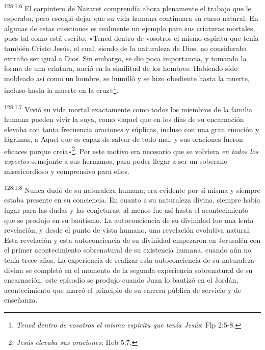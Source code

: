\par 
\textsuperscript{128:1.6} El carpintero de Nazaret comprendía ahora plenamente el trabajo que le esperaba, pero escogió dejar que su vida humana continuara su curso natural. En algunas de estas cuestiones es realmente un ejemplo para sus criaturas mortales, pues tal como está escrito: «Tened dentro de vosotros el mismo espíritu que tenía también Cristo Jesús, el cual, siendo de la naturaleza de Dios, no consideraba extraño ser igual a Dios. Sin embargo, se dio poca importancia, y tomando la forma de una criatura, nació en la similitud de los hombres. Habiendo sido moldeado así como un hombre, se humilló y se hizo obediente hasta la muerte, incluso hasta la muerte en la cruz»\footnote{\textit{Tened dentro de vosotros el mismo espíritu que tenía Jesús}: Flp 2:5-8.}.

\par 
\textsuperscript{128:1.7} Vivió su vida mortal exactamente como todos los miembros de la familia humana pueden vivir la suya, como «aquel que en los días de su encarnación elevaba con tanta frecuencia oraciones y súplicas, incluso con una gran emoción y lágrimas, a Aquel que es capaz de salvar de todo mal, y sus oraciones fueron eficaces porque creía»\footnote{\textit{Jesús elevaba sus oraciones}: Heb 5:7.}. Por este motivo era necesario que se volviera \textit{en todos los aspectos} semejante a sus hermanos, para poder llegar a ser un soberano misericordioso y comprensivo para ellos.

\par 
\textsuperscript{128:1.8} Nunca dudó de su naturaleza humana; era evidente por sí misma y siempre estaba presente en su conciencia. En cuanto a su naturaleza divina, siempre había lugar para las dudas y las conjeturas; al menos fue así hasta el acontecimiento que se produjo en su bautismo. La autoconciencia de su divinidad fue una lenta revelación, y desde el punto de vista humano, una revelación evolutiva natural. Esta revelación y esta autoconciencia de su divinidad empezaron en Jerusalén con el primer acontecimiento sobrenatural de su existencia humana, cuando aún no tenía trece años. La experiencia de realizar esta autoconciencia de su naturaleza divina se completó en el momento de la segunda experiencia sobrenatural de su encarnación; este episodio se produjo cuando Juan lo bautizó en el Jordán, acontecimiento que marcó el principio de su carrera pública de servicio y de enseñanza.

